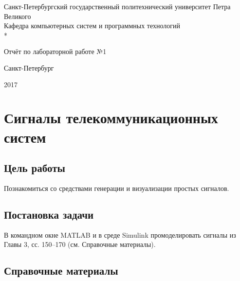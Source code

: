 \documentclass[12pt,a4paper]{article}
\begin{document}
\begin{titlepage}
	\newpage
	
	\begin{center}
		Санкт-Петербургский государственный политехнический 
		университет Петра Великого \\
		\vspace{1cm}
		Кафедра компьютерных систем и программных технологий\\*
	\end{center}
	
	\vspace{8em}
	
	\begin{center}
		 Отчёт по лабораторной работе №1
	\end{center}
	
	\vspace{2.5em}

	\vspace{6em}

	\vspace{\fill}
	
	\begin{center}
		Санкт-Петербург
		
		 2017
	\end{center}
	
\end{titlepage}

\newpage

\section{Сигналы телекоммуникационных систем}

\subsection{Цель работы}

Познакомиться со средствами генерации и визуализации простых сигналов.

\subsection{Постановка задачи}

В командном окне MATLAB и в среде Simulink промоделировать сигналы из Главы 3, сс. 150–170 (см. Справочные материалы).

\subsection{Справочные материалы}
\end{document}
